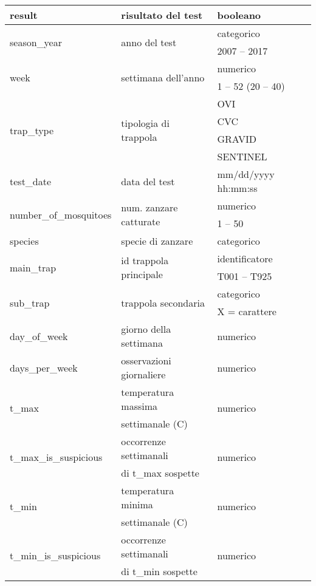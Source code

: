 \begin{longtable}{lll}
	result	& risultato del test  &	booleano \\\hline
	\multirow{2}{*}{season\_year} & \multirow{2}{*}{anno del test} &  
	categorico \\
	& &{2007} -- {2017}       	\\ \hline
	\multirow{2}{*}{week}					&\multirow{2}{*}{settimana 
		dell'anno}  & numerico    \\ 
	& & {1} -- {52} ({20} -- {40})\\\hline
	\multirow{4}{*}{trap\_type}				& \multirow{4}{*}{tipologia di 
		trappola} &     OVI\\
	&& CVC\\
	&& GRAVID\\
	&& SENTINEL\\\hline
	{test\_date}	&{data del test}   &   mm/dd/yyyy hh:mm:ss \\\hline
	\multirow{2}{*}{number\_of\_mosquitoes}	& \multirow{2}{*}{num. zanzare 
		catturate} &  numerico        	\\ 
	& & {1} -- {50} \\ \hline
	species & specie di zanzare	 &	categorico\\	\hline	
	\multirow{2}{*}{main\_trap}	&\multirow{2}{*}{id trappola principale} 
	&  	identificatore        	\\ 
	& & T001 -- T925\\\hline
	\multirow{2}{*}{sub\_trap}	&\multirow{2}{*}{trappola 
		secondaria} &  categorico        	\\ 
	&& X = carattere\\\hline
	{day\_of\_week}	& {giorno della 
		settimana} &  numerico  \\\hline
	days\_per\_week & {osservazioni giornaliere}	& numerico \\ \hline
	\multirow{2}{*}{t\_max}	& temperatura massima & \multirow{2}{*}{numerico}\\
	& settimanale (\degree C) & \\ \hline
	\multirow{2}{*}{t\_max\_is\_suspicious}		& occorrenze settimanali   
	&  \multirow{2}{*}{numerico}	 \\
	& di t\_max sospette & 	 \\ \hline	
	\multirow{2}{*}{t\_min}		& temperatura minima  	  & 
	\multirow{2}{*}{numerico}		\\
	& settimanale (\degree C) & \\ \hline
	\multirow{2}{*}{t\_min\_is\_suspicious}	& occorrenze settimanali  &  
	\multirow{2}{*}{numerico}	 \\
	& di t\_min sospette &  \\ \hline		

\end{longtable}
